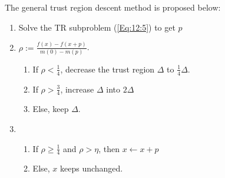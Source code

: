 The general trust region descent method is proposed below:
\begin{enumerate}
\item
Solve the TR subproblem (\ref{Eq:12:5}) to get $p$
\item
$\rho:=\frac{f(x) - f(x+p)}{m(0) - m(p)}$. 
\begin{enumerate}
\item
If $\rho<\frac{1}{4}$, decrease the trust region $\Delta$ to $\frac{1}{4}\Delta$.
\item
If $\rho>\frac{3}{4}$, increase $\Delta$ into $2\Delta$
\item
Else, keep $\Delta$.
\end{enumerate}
\item
\begin{enumerate}
\item
If $\rho\ge\frac{1}{4}$ and $\rho>\eta$, then $x\leftarrow x+p$
\item
Else, $x$ keeps unchanged.
\end{enumerate}
\end{enumerate}













